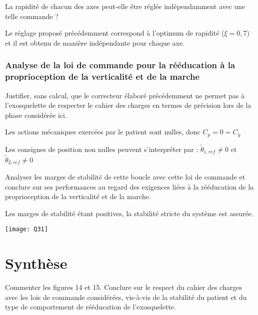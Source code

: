 \documentclass[11pt]{article}
\begin{document}
\UPSTIquestion La rapidité de chacun des axes peut-elle être réglée indépendamment avec une telle commande ?

\begin{UPSTIcorrige}
Le réglage proposé précédemment correspond à l'optimum de rapidité ($\xi=0,7$) et il est obtenu de manière indépendante pour chaque axe.

\end{UPSTIcorrige}

\subsubsection{ Analyse de la loi de commande pour la rééducation à la proprioception de la verticalité
et de la marche}
\UPSTIquestion Justifier, sans calcul, que le correcteur élaboré précédemment ne permet pas à l’exosquelette de respecter le cahier des charges en termes de précision lors de la phase considérée ici.


\begin{UPSTIcorrige}

Les actions mécaniques exercées par le patient sont nulles, donc $C_p=0=C_g$

Les consignes de position non nulles peuvent s'interpréter par : $\tilde{\theta}_{1,ref}\neq 0$ et $\tilde{\theta}_{2,ref}\neq 0$

\end{UPSTIcorrige}

\UPSTIquestion Analyser les marges de stabilité de cette boucle avec cette loi de commande et conclure sur ses
performances au regard des exigences liées à la rééducation de la proprioception de la verticalité et de la
marche.

\begin{UPSTIcorrige}
Les marges de stabilité étant positives, la stabilité stricte du système est assurée. 
\begin{center}
\texttt{[image: Q31]}
\end{center}
\end{UPSTIcorrige}

\section{Synthèse}

\UPSTIquestion Commenter les figures 14 et 15. Conclure sur le respect du cahier des charges avec les lois de commande
considérées, vis-à-vis de la stabilité du patient et du type de comportement de rééducation de l’exosquelette.

\begin{UPSTIcorrige}

\end{UPSTIcorrige}
\end{document}
